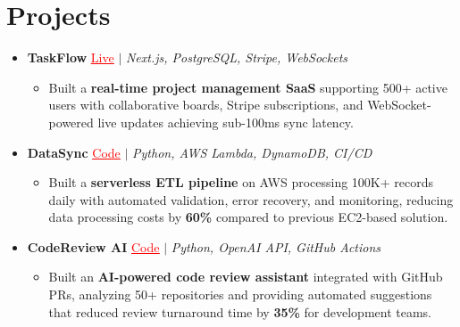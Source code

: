 \documentclass[letterpaper,10pt]{article}
\newcommand{\resumeItem}[1]{\item\small{{#1 \vspace{-2pt}}}}
\newcommand{\resumeProjectHeading}[1]{\item \small #1 \vspace{-2pt}}
\newcommand{\resumeSubHeadingListStart}{\begin{itemize}[leftmargin=0.0in, label={}]}
\newcommand{\resumeSubHeadingListEnd}{\end{itemize}}
\newcommand{\resumeProjItemListStart}{\begin{itemize}[leftmargin=0.15in,label=\textbullet,itemsep=0pt,topsep=0pt,parsep=0pt,partopsep=0pt]}
\newcommand{\resumeProjItemListEnd}{\end{itemize}\vspace{-4pt}}
\begin{document}
\section{Projects}
\resumeSubHeadingListStart
\vspace{-2pt}
\resumeProjectHeading{\textbf{TaskFlow} {\href{https://taskflow-demo.com/}{\textcolor{red}{\underline{Live}}}} $|$ \emph{Next.js, PostgreSQL, Stripe, WebSockets}}
\resumeProjItemListStart
\resumeItem{Built a \textbf{real-time project management SaaS} supporting 500+ active users with collaborative boards, Stripe subscriptions, and WebSocket-powered live updates achieving sub-100ms sync latency.}
\resumeProjItemListEnd
\vspace{3pt}
\resumeProjectHeading{\textbf{DataSync} {\href{https://github.com/janedev/datasync}{\textcolor{red}{\underline{Code}}}} $|$ \emph{Python, AWS Lambda, DynamoDB, CI/CD}}
\resumeProjItemListStart
\resumeItem{Built a \textbf{serverless ETL pipeline} on AWS processing 100K+ records daily with automated validation, error recovery, and monitoring, reducing data processing costs by \textbf{60\%} compared to previous EC2-based solution.}
\resumeProjItemListEnd
\vspace{3pt}
\resumeProjectHeading{\textbf{CodeReview AI} {\href{https://github.com/janedev/codereview-ai}{\textcolor{red}{\underline{Code}}}} $|$ \emph{Python, OpenAI API, GitHub Actions}}
\resumeProjItemListStart
\resumeItem{Built an \textbf{AI-powered code review assistant} integrated with GitHub PRs, analyzing 50+ repositories and providing automated suggestions that reduced review turnaround time by \textbf{35\%} for development teams.}
\resumeProjItemListEnd
\resumeSubHeadingListEnd
\end{document}
